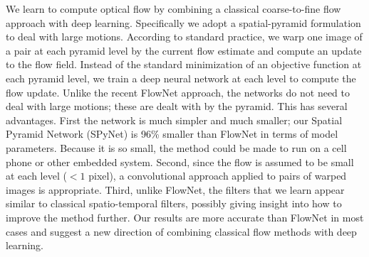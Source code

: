 We learn to compute optical flow by combining a classical coarse-to-fine flow approach with deep learning.
Specifically we adopt a spatial-pyramid formulation to deal with large motions.
According to standard practice, we warp one image of a pair at each pyramid level by the current flow estimate and compute an update to the flow field.
Instead of the standard minimization of an objective function at each pyramid level, we train a deep neural network at each level to compute the flow update.
Unlike the recent FlowNet approach, the networks do not need to deal with large motions; these are dealt with by the pyramid.  
This has several advantages. First the network is much simpler and much smaller; our Spatial Pyramid Network (SPyNet) is 96\% smaller than FlowNet in terms of model parameters.
Because it is so small, the method could be made to run on a cell phone or other embedded system.
Second, since the flow is assumed to be small at each level ($< 1$ pixel), a convolutional approach applied to pairs of warped images is appropriate.
Third, unlike FlowNet, the filters that we learn appear similar to classical spatio-temporal filters, possibly giving insight into how to improve the method further.
Our results are more accurate than FlowNet in most cases and suggest a new direction of combining classical flow methods with deep learning. 
%

